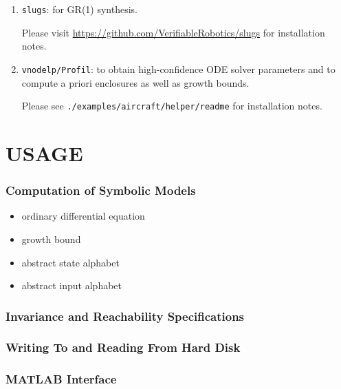 \documentclass[a4paper]{amsart}
\begin{document}
\begin{enumerate}
  \item {\tt slugs}: for GR(1) synthesis. 
  
  Please visit \url{https://github.com/VerifiableRobotics/slugs} for
  installation notes.

  \item {\tt vnodelp/Profil}: to obtain high-confidence ODE solver parameters
  and to compute a priori enclosures as well as growth bounds.

  Please see {\tt ./examples/aircraft/helper/readme} for 
  installation notes.


\end{enumerate}




	

\newpage


\part{USAGE}

\section{Computation of Symbolic Models}
\label{s:usage:abs}

\begin{itemize}
  \item ordinary differential equation 
  \item growth bound
  \item abstract state alphabet 
  \item abstract input alphabet 
\end{itemize}


\section{Invariance and Reachability Specifications}


\section{Writing To and Reading From Hard Disk}

\section{MATLAB Interface}
\end{document}
